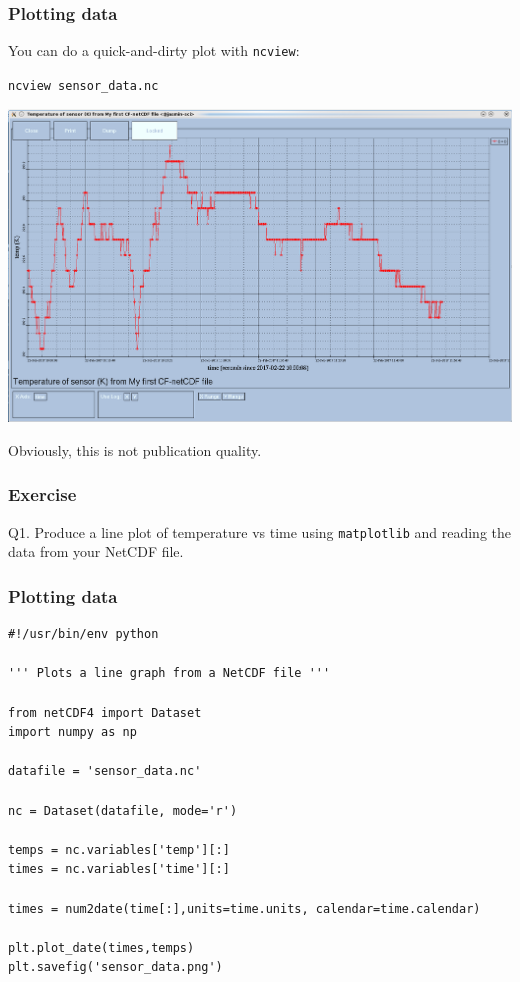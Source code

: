\documentclass[aspectratio=1610,9pt]{beamer} %
\begin{document}
\begin{frame}
\frametitle{Plotting data}

You can do a quick-and-dirty plot with \texttt{ncview}:

\texttt{ncview sensor\_data.nc}

\includegraphics[width=\textwidth]{sensor-data-ncview.png}

Obviously, this is not publication quality.

\subsubsection{Exercise}

Q1. Produce a line plot of temperature vs time using \texttt{matplotlib}
and reading the data from your NetCDF file.

\end{frame}
\begin{frame}[fragile]
\frametitle{Plotting data}

\begin{verbatim}
#!/usr/bin/env python

''' Plots a line graph from a NetCDF file '''

from netCDF4 import Dataset
import numpy as np

datafile = 'sensor_data.nc'

nc = Dataset(datafile, mode='r')

temps = nc.variables['temp'][:]
times = nc.variables['time'][:]

times = num2date(time[:],units=time.units, calendar=time.calendar)

plt.plot_date(times,temps)
plt.savefig('sensor_data.png')
\end{verbatim}

\end{frame}
\end{document}
